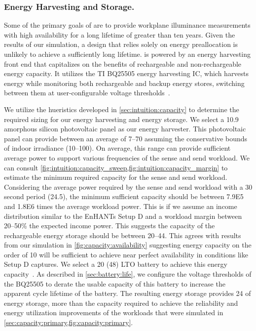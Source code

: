 \subsubsection{Energy Harvesting and Storage.}
Some of the primary goals of \name are to provide workplane illuminance measurements with high availability for a long lifetime of greater than ten years. 
Given the results of our simulation, a design that relies solely on energy preallocation is unlikely to achieve a sufficiently long lifetime. 
\name is powered by an energy harvesting front end that capitalizes on the benefits
of rechargeable and non-rechargeable energy capacity. 
It utilizes the TI BQ25505 energy harvesting IC, which
harvests energy while monitoring both
rechargeable and backup energy stores,
switching between them at user-configurable voltage thresholds~\cite{bq25505}. 

We utilize the hueristics developed in \cref{sec:intuition:capacity} to determine the required sizing for our energy harvesting and energy storage. 
We select a 10.9\ssi{\centi\meter\squared} amorphous
silicon photovoltaic panel as our energy harvester.
This photovoltaic panel can provide between an average of 7--70\ssi{\micro\watt} assuming the conservative bounds of indoor irradiance (10--100\ssi[per-mode=symbol]{\micro\watt\per\centi\meter\squared}).
On average, this range can provide sufficient average power to support various frequencies of the sense and send workload.
We can consult \cref{fig:intuition:capacity_sweep,fig:intuition:capacity_margin} to estimate the minimum required capacity for the sense and send workload.
Considering the average power required by the sense and send workload with a 30 second period (24.5\ssi{\micro\watt}), 
the minimum sufficient capacity should be between \num{7.9E5} and \num{1.8E6} times the average workload power. This is if we assume an income distribution similar to the EnHANTs Setup D and a workload margin between 20--50\% the expected income power.
This suggests the capacity of the rechargeable energy storage should be between 20--44\ssi{\milli\Wh}.
This agrees with results from our simulation in \cref{fig:capacity:availability} suggesting energy capacity on the order of 10\ssi{\milli\Wh} will be sufficient to achieve near perfect availability in conditions like Setup D captures.
We select a 20\ssi{\milli\Ah} (48\ssi{\milli\Wh}) LTO battery 
to achieve this energy capacity~\cite{LTODatasheet, LTODatasheet2}.
As described in \cref{sec:battery:life},
we configure the voltage thresholds of the BQ25505 to derate the 
usable capacity of this battery to  
increase the apparent cycle lifetime of the battery. 
The resulting energy storage provides 24\ssi{\milli\Wh} of
energy storage, more than the capacity required to achieve the reliability and energy utilization
improvements of the workloads that were simulated in \cref{sec:capacity:primary,fig:capacity:primary}.

